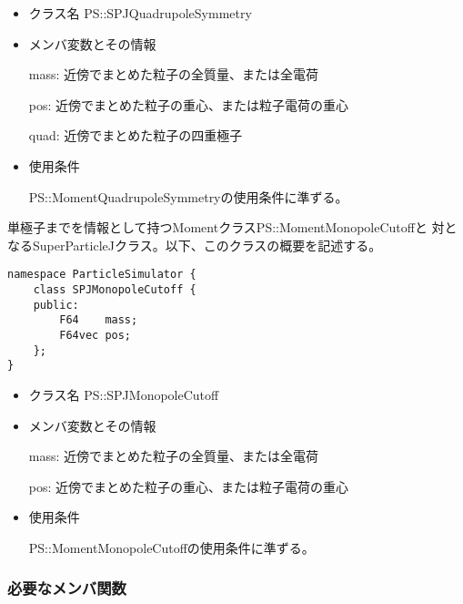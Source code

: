 \begin{itemize}
\item クラス名
  PS::SPJQuadrupoleSymmetry

\item メンバ変数とその情報

  mass: 近傍でまとめた粒子の全質量、または全電荷

  pos: 近傍でまとめた粒子の重心、または粒子電荷の重心
        
  quad: 近傍でまとめた粒子の四重極子

\item 使用条件

  PS::MomentQuadrupoleSymmetryの使用条件に準ずる。

\end{itemize}


\label{sec:SPJMonopoleCutoff}

単極子までを情報として持つMomentクラスPS::MomentMonopoleCutoffと
対となるSuperParticleJクラス。以下、このクラスの概要を記述する。
\begin{screen}
\begin{verbatim}
namespace ParticleSimulator {
    class SPJMonopoleCutoff {
    public:
        F64    mass;
        F64vec pos;
    };
}
\end{verbatim}
\end{screen}

\begin{itemize}
\item クラス名
  PS::SPJMonopoleCutoff

\item メンバ変数とその情報

  mass: 近傍でまとめた粒子の全質量、または全電荷

  pos: 近傍でまとめた粒子の重心、または粒子電荷の重心

\item 使用条件

  PS::MomentMonopoleCutoffの使用条件に準ずる。

\end{itemize}

\subsubsection{必要なメンバ関数}



